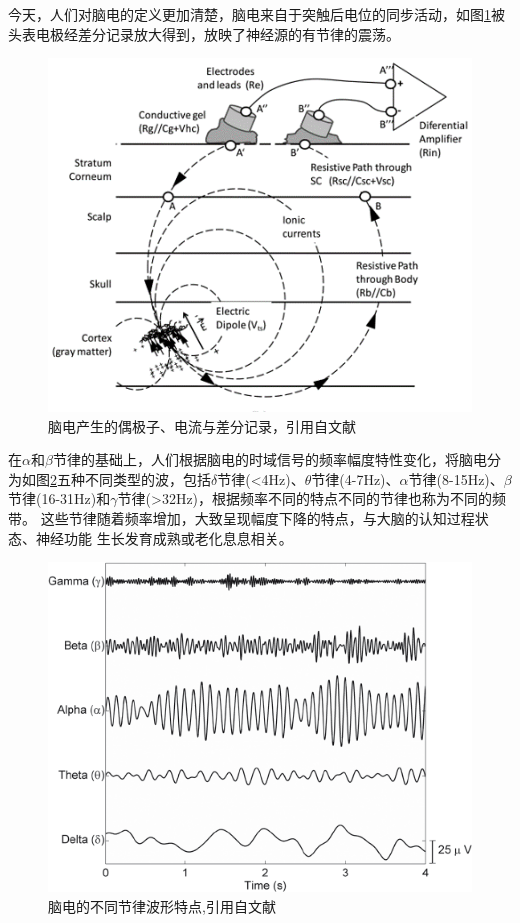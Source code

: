 今天，人们对脑电的定义更加清楚，脑电来自于突触后电位的同步活动，如图\ref{fig2}被头表电极经差分记录放大得到，放映了神经源的有节律的震荡。
\begin{figure}
	\includegraphics[width=12cm]{pic/xulun/EEGrecord.png}
	\caption{脑电产生的偶极子、电流与差分记录，引用自文献}
	\label{fig2}
\end{figure}
在$\alpha$和$\beta$节律的基础上，人们根据脑电的时域信号的频率幅度特性变化，将脑电分为如图\ref{fig3}五种不同类型的波，包括$\delta$节律(<4Hz)、$\theta$节律(4-7Hz)、$\alpha$节律(8-15Hz)、$\beta$节律(16-31Hz)和$\gamma$节律(>32Hz)，根据频率不同的特点不同的节律也称为不同的频带。 这些节律随着频率增加，大致呈现幅度下降的特点，与大脑的认知过程状态、神经功能
生长发育成熟或老化息息相关。
\begin{figure}
	\includegraphics[width=12cm]{pic/xulun/EEGrhythm.png}
	\caption{脑电的不同节律波形特点,引用自文献}
	\label{fig3}
\end{figure}

